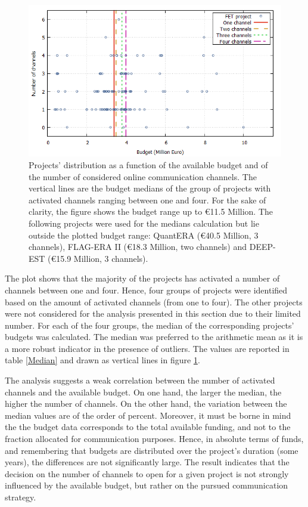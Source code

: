 \begin{figure}[!t] 
 \begin{center}
 \includegraphics[scale=0.4]{Images/Channel_budget.png}
 \caption{Projects' distribution as a function of the available budget and of the number of considered online communication channels. The vertical lines are the budget medians of the group of projects with activated channels ranging between one and four. For the sake of clarity, the figure shows the budget range up to \euro 11.5 Million. The following projects were used for the medians calculation but lie outside the plotted budget range: QuantERA (\euro 40.5 Million, 3 channels), FLAG-ERA II (\euro 18.3 Million, two channels) and DEEP-EST (\euro 15.9 Million, 3 channels).}
 \label{Channel_budget}
 \end{center}
\end{figure}

The plot shows that the majority of the projects has activated a number of channels between one and four. Hence, four groups of projects were identified based on the amount of activated channels (from one to four). The other projects were not considered for the analysis presented in this section due to their limited number. For each of the four groups, the median of the corresponding projects' budgets was calculated. The median was preferred to the arithmetic mean as it is a more robust indicator in the presence of outliers. The values are reported in table \ref{Median} and drawn as vertical lines in figure \ref{Channel_budget}. 

The analysis suggests a weak correlation between the number of activated channels and the available budget. On one hand, the larger the median, the higher the number of channels. On the other hand, the variation between the median values are of the order of percent. Moreover, it must be borne in mind the the budget data corresponds to the total available funding, and not to the fraction allocated for communication purposes. Hence, in absolute terms of funds, and remembering that budgets are distributed over the project's duration (some years), the differences are not significantly large. The result indicates that the decision on the number of channels to open for a given project is not strongly influenced by the available budget, but rather on the pursued communication strategy. 

